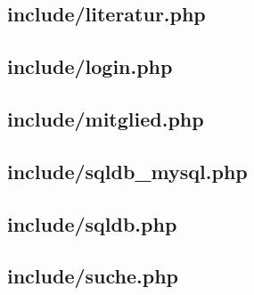 \subsection{include/literatur.php}


\subsection{include/login.php}


\subsection{include/mitglied.php}


\subsection{include/sqldb\_mysql.php}


\subsection{include/sqldb.php}


\subsection{include/suche.php}

